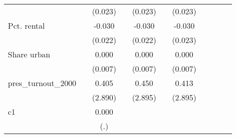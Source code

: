 {\begin{tabular}{l*{10}{c}}
                    &                     &     (0.023)         &                     &     (0.023)         &                     &     (0.023)         &                     &                     &                     &                     \\
\addlinespace
Pct. rental         &                     &      -0.030         &                     &      -0.030         &                     &      -0.030         &                     &                     &                     &                     \\
                    &                     &     (0.022)         &                     &     (0.022)         &                     &     (0.023)         &                     &                     &                     &                     \\
\addlinespace
Share urban         &                     &       0.000         &                     &       0.000         &                     &       0.000         &                     &                     &                     &                     \\
                    &                     &     (0.007)         &                     &     (0.007)         &                     &     (0.007)         &                     &                     &                     &                     \\
\addlinespace
pres\_turnout\_2000   &                     &       0.405         &                     &       0.450         &                     &       0.413         &                     &                     &                     &                     \\
                    &                     &     (2.890)         &                     &     (2.895)         &                     &     (2.895)         &                     &                     &                     &                     \\
\addlinespace
c1                  &                     &       0.000         &                     &                     &                     &                     &                     &                     &                     &                     \\
                    &                     &         (.)         &                     &                     &                     &                     &                     &                     &                     &                     \\

\end{tabular}}
